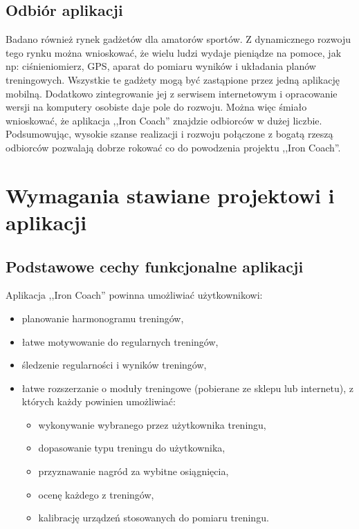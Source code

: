 \subsection{Odbiór aplikacji}
\noindent Badano również rynek gadżetów dla amatorów sportów. Z dynamicznego rozwoju tego rynku można wnioskować, że wielu ludzi wydaje pieniądze na pomoce, jak np: ciśnieniomierz, GPS, aparat do pomiaru wyników i układania planów treningowych. Wszystkie te gadżety mogą być zastąpione przez jedną aplikację mobilną. Dodatkowo zintegrowanie jej z serwisem internetowym i opracowanie wersji na komputery osobiste daje pole do rozwoju. Można więc śmiało wnioskować, że aplikacja ,,Iron Coach'' znajdzie odbiorców w dużej liczbie. \\
\indent Podsumowując, wysokie szanse realizacji i rozwoju połączone z bogatą rzeszą odbiorców pozwalają dobrze rokować co do powodzenia projektu ,,Iron Coach''.
\clearpage
\section{Wymagania stawiane projektowi i aplikacji}
\subsection{Podstawowe cechy funkcjonalne aplikacji}
\label{pfunk}
\noindent Aplikacja ,,Iron Coach'' powinna umożliwiać użytkownikowi:
\begin{itemize}
  \item planowanie harmonogramu treningów,
  \item łatwe motywowanie do regularnych treningów,
  \item śledzenie regularności i wyników treningów,
  \item łatwe rozszerzanie o moduły treningowe (pobierane ze sklepu lub internetu), z których każdy powinien umożliwiać:
    \begin{itemize}
      \item wykonywanie wybranego przez użytkownika treningu,
      \item dopasowanie typu treningu do użytkownika,
      \item przyznawanie nagród za wybitne osiągnięcia,
      \item ocenę każdego z treningów,
      \item kalibrację urządzeń stosowanych do pomiaru treningu.
    \end{itemize}
\end{itemize}
